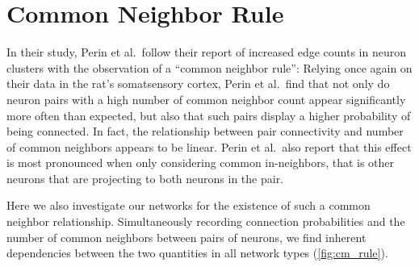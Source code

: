 
\section{Common Neighbor Rule}


In their study, Perin et al.\ follow their report of increased edge
counts in neuron clusters with the observation of a \enquote{common
  neighbor rule}: Relying once again on
their data in the rat's somatsensory cortex, Perin et al.\ find that
not only do neuron pairs with a high number of common neighbor count
 appear
significantly more often than expected, but also that such pairs
display a higher probability of being connected. In fact, the
relationship between pair connectivity and number of common neighbors
appears to be linear. Perin et al.\ also report that this effect is
most pronounced when only considering common in-neighbors, that is
other neurons that are projecting to both neurons in the pair.

Here we also investigate our networks for the existence of such a
common neighbor relationship. Simultaneously recording connection
probabilities and the number of common neighbors between pairs of
neurons, we find inherent dependencies between the two quantities in
all network types (\autoref{fig:cm_rule}). 

